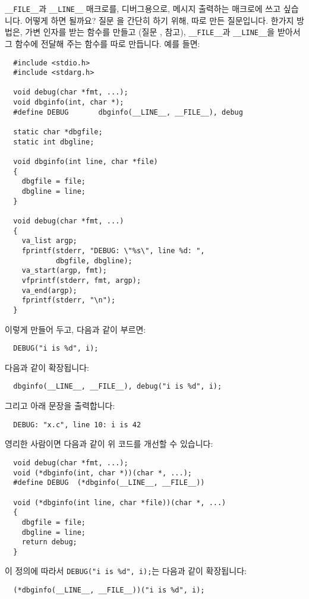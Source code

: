 \begin{faq}
	\verb+__FILE__+과 \verb+__LINE__+ 매크로를, 디버그용으로,
        메시지 출력하는 매크로에 쓰고 싶습니다. 어떻게 하면 될까요?
\A
	질문 을 간단히 하기 위해, 따로 만든 질문입니다.
        한가지 방법은, 가변 인자를 받는 함수를 만들고 (질문 ,  참고),
        \verb+__FILE__+과 \verb+__LINE__+을 받아서 그 함수에 전달해 주는
        함수를 따로 만듭니다. 예를 들면:
\begin{verbatim}
  #include <stdio.h>
  #include <stdarg.h>

  void debug(char *fmt, ...);
  void dbginfo(int, char *);
  #define DEBUG       dbginfo(__LINE__, __FILE__), debug

  static char *dbgfile;
  static int dbgline;

  void dbginfo(int line, char *file)
  {
    dbgfile = file;
    dbgline = line;
  }

  void debug(char *fmt, ...)
  {
    va_list argp;
    fprintf(stderr, "DEBUG: \"%s\", line %d: ",
            dbgfile, dbgline);
    va_start(argp, fmt);
    vfprintf(stderr, fmt, argp);
    va_end(argp);
    fprintf(stderr, "\n");
  }
\end{verbatim}
	\noindent 이렇게 만들어 두고, 다음과 같이 부르면:
\begin{verbatim}
  DEBUG("i is %d", i);
\end{verbatim}
	\noindent 다음과 같이 확장됩니다:
\begin{verbatim}
  dbginfo(__LINE__, __FILE__), debug("i is %d", i);
\end{verbatim}
	\noindent 그리고 아래 문장을 출력합니다:
\begin{verbatim}
  DEBUG: "x.c", line 10: i is 42
\end{verbatim}

	영리한 사람이면 다음과 같이 위 코드를 개선할 수 있습니다:
\begin{verbatim}
  void debug(char *fmt, ...);
  void (*dbginfo(int, char *))(char *, ...);
  #define DEBUG  (*dbginfo(__LINE__, __FILE__))

  void (*dbginfo(int line, char *file))(char *, ...)
  {
    dbgfile = file;
    dbgline = line;
    return debug;
  }
\end{verbatim}
	\noindent 이 정의에 따라서 \verb+DEBUG("i is %d", i);+는 다음과
          같이 확장됩니다:
\begin{verbatim}
  (*dbginfo(__LINE__, __FILE__))("i is %d", i);
\end{verbatim}


\end{faq}
